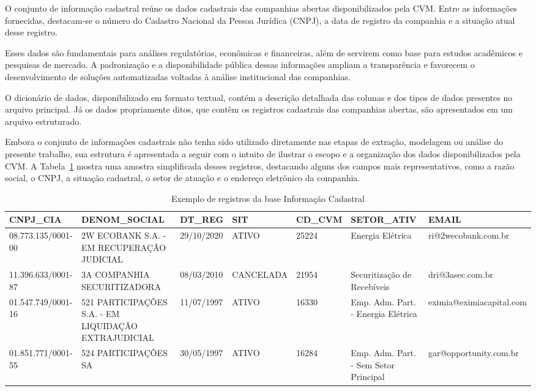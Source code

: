 O conjunto de informação cadastral reúne os dados cadastrais das companhias abertas disponibilizados pela CVM. Entre as informações fornecidas, destacam-se o número do Cadastro Nacional da Pessoa Jurídica (CNPJ), a data de registro da companhia e a situação atual desse registro.

Esses dados são fundamentais para análises regulatórias, econômicas e financeiras, além de servirem como base para estudos acadêmicos e pesquisas de mercado. A padronização e a disponibilidade pública dessas informações ampliam a transparência e favorecem o desenvolvimento de soluções automatizadas voltadas à análise institucional das companhias.

O dicionário de dados, disponibilizado em formato textual, contém a descrição detalhada das colunas e dos tipos de dados presentes no arquivo principal. Já os dados propriamente ditos, que contêm os registros cadastrais das companhias abertas, são apresentados em um arquivo estruturado.

Embora o conjunto de informações cadastrais não tenha sido utilizado diretamente nas etapas de extração, modelagem ou análise do presente trabalho, sua estrutura é apresentada a seguir com o intuito de ilustrar o escopo e a organização dos dados disponibilizados pela CVM. A Tabela~\ref{tab:exemplo_informacao_cadastral} mostra uma amostra simplificada desses registros, destacando alguns dos campos mais representativos, como a razão social, o CNPJ, a situação cadastral, o setor de atuação e o endereço eletrônico da companhia.

\begin{table}[!htb]
	\centering
	\caption{Exemplo de registros da base Informação Cadastral}
	\label{tab:exemplo_informacao_cadastral}
	\scriptsize
	\begin{tabularx}{\textwidth}{|X|X|X|X|X|X|X|}
		\hline
		\textbf{CNPJ\_CIA} & \textbf{DENOM\_SOCIAL} & \textbf{DT\_REG} & \textbf{SIT} & \textbf{CD\_CVM} & \textbf{SETOR\_ATIV} & \textbf{EMAIL} \\
		\hline
		08.773.135/0001-00 & 2W ECOBANK S.A. - EM RECUPERAÇÃO JUDICIAL & 29/10/2020 & ATIVO & 25224 & Energia Elétrica & ri@2wecobank.com.br \\
		\hline
		11.396.633/0001-87 & 3A COMPANHIA SECURITIZADORA & 08/03/2010 & CANCELADA & 21954 & Securitização de Recebíveis & dri@3asec.com.br \\
		\hline
		01.547.749/0001-16 & 521 PARTICIPAÇÕES S.A. - EM LIQUIDAÇÃO EXTRAJUDICIAL & 11/07/1997 & ATIVO & 16330 & Emp. Adm. Part. - Energia Elétrica & eximia@eximiacapital.com \\
		\hline
		01.851.771/0001-55 & 524 PARTICIPAÇÕES SA & 30/05/1997 & ATIVO & 16284 & Emp. Adm. Part. - Sem Setor Principal & gar@opportunity.com.br \\
		\hline
	\end{tabularx}
\end{table}

